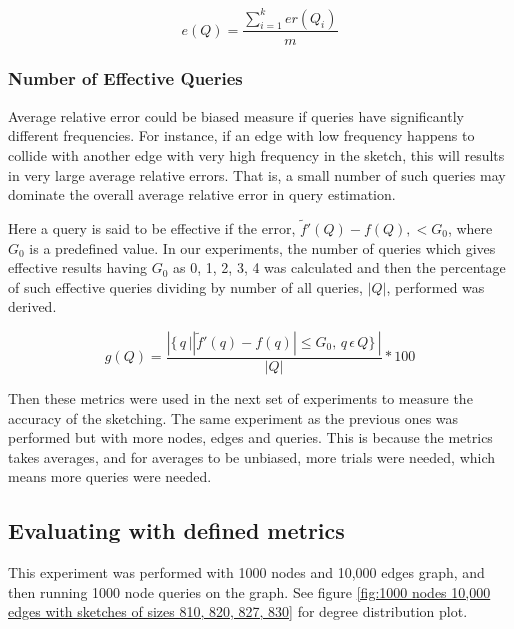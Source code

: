 \documentclass[conference]{IEEEtran}
\begin{document}
\begin{equation}
e(Q) =  \frac{\sum_{i=1}^{k} er(Q_i)}{m}
\end{equation}

\subsubsection{Number of Effective Queries}
Average relative error could be biased measure if queries have significantly different frequencies. For instance, if an edge with low frequency happens to collide with another edge with very high frequency in the sketch, this will results in very large average relative errors. That is, a small number of such queries may dominate the overall average relative error in query estimation.


Here a query is said to be effective if the error, $\tilde{f}'(Q) - f(Q), < G_0$,  where $G_0$ is a predefined value. In our experiments, the number of queries which gives effective results having $G_0$ as 0, 1, 2, 3, 4 was calculated and then the percentage of such effective queries dividing by number of all queries, $|Q|$, performed was derived. 


\begin{equation}
g(Q) =  \frac{\left | \{\,q\, |   \left |\tilde{f}'(q) - f(q)\right | \leq G_0, \,q \, \epsilon  \,Q\} \, \right|}{|Q|}*100
\end{equation}

 
Then these metrics were used in the next set of experiments to measure the accuracy of the sketching. The same experiment as the previous ones was performed but with more nodes, edges and queries. This is because the metrics takes averages, and for averages to be unbiased, more trials were needed, which means more queries were needed.

\subsection{Evaluating with defined metrics}

This experiment was performed with 1000 nodes and 10,000 edges graph, and then running 1000 node queries on the graph. See figure \ref{fig:1000 nodes 10,000 edges with sketches of sizes 810, 820, 827, 830} for degree distribution plot.
\end{document}
